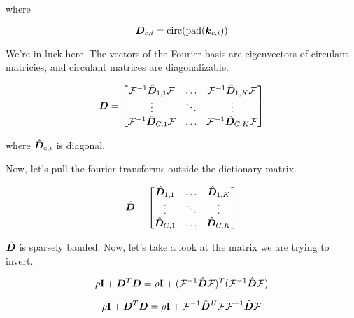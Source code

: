 \documentclass{article}
\begin{document}
where

\begin{equation}
\bm{D}_{c,i} = \operatorname{circ}(\operatorname{pad}(\bm{k}_{c,i}))
\end{equation}

We're in luck here. The vectors of the Fourier basis are eigenvectors of circulant matricies, and circulant matrices are diagonalizable.

\begin{equation}
\begin{aligned}
\bm{D} = \begin{bmatrix} \mathcal{F}^{-1}\hat{\bm{D}}_{1,1}\mathcal{F} & \hdots & \mathcal{F}^{-1}\hat{\bm{D}}_{1,K}\mathcal{F} \\
                      \vdots & \ddots & \vdots \\
                      \mathcal{F}^{-1}\hat{\bm{D}}_{C,1}\mathcal{F} & \hdots & \mathcal{F}^{-1}\hat{\bm{D}}_{C,K}\mathcal{F}
      \end{bmatrix}
\end{aligned}
\end{equation}

where $\hat{\bm{D}}_{c,i}$ is diagonal.

Now, let's pull the fourier transforms outside the dictionary matrix.

\begin{equation}
\begin{aligned}
\hat{\bm{D}} = \begin{bmatrix} \hat{\bm{D}}_{1,1} & \hdots & \hat{\bm{D}}_{1,K} \\
                      \vdots & \ddots & \vdots \\
                      \hat{\bm{D}}_{C,1} & \hdots & \hat{\bm{D}}_{C,K}
      \end{bmatrix}
\end{aligned}
\end{equation}

$\hat{\bm{D}}$ is sparsely banded. Now, let's take a look at the matrix we are trying to invert.


\begin{equation}
\rho{\bf I} + \bm{D}^T\bm{D} = \rho{\bf I} + (\mathcal{F}^{-1}\hat{\bm{D}}\mathcal{F})^T(\mathcal{F}^{-1}\hat{\bm{D}}\mathcal{F})
\end{equation}
 
\begin{equation}
\rho{\bf I} + \bm{D}^T\bm{D} = \rho{\bf I} + \mathcal{F}^{-1}\hat{\bm{D}}^H\mathcal{F}\mathcal{F}^{-1}\hat{\bm{D}}\mathcal{F}
\end{equation}
\end{document}
